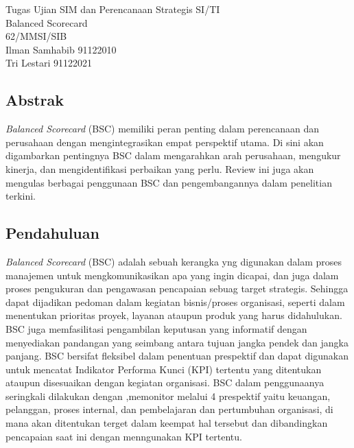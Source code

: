 \documentclass{article}
\title{}
\begin{document}
\begin{center}
    Tugas Ujian SIM dan Perencanaan Strategis SI/TI\\
    Balanced Scorecard\\
    62/MMSI/SIB\\
    Ilman Samhabib 91122010\\
    Tri Lestari 91122021\\	
\end{center}
\subsection*{Abstrak}



\emph{Balanced Scorecard} (BSC) memiliki peran penting dalam perencanaan dan perusahaan dengan mengintegrasikan empat perspektif utama. Di sini akan digambarkan pentingnya BSC dalam mengarahkan arah perusahaan, mengukur kinerja, dan mengidentifikasi perbaikan yang perlu. Review ini juga akan mengulas berbagai penggunaan BSC dan pengembangannya dalam penelitian terkini.
\subsection*{Pendahuluan}
\emph{Balanced Scorecard} (BSC) adalah sebuah kerangka yng digunakan dalam proses manajemen untuk mengkomunikasikan apa yang ingin dicapai, dan juga dalam proses pengukuran dan pengawasan pencapaian sebuag target strategis. Sehingga dapat dijadikan pedoman dalam kegiatan bisnis/proses organisasi, seperti dalam menentukan  prioritas proyek, layanan ataupun produk  yang harus didahulukan. BSC juga memfasilitasi pengambilan keputusan yang informatif dengan menyediakan pandangan yang seimbang antara tujuan jangka pendek dan jangka panjang. BSC bersifat fleksibel dalam penentuan prespektif dan dapat digunakan untuk mencatat Indikator Performa Kunci (KPI) tertentu yang ditentukan ataupun disesuaikan dengan kegiatan organisasi. BSC dalam penggunaanya seringkali dilakukan dengan ,memonitor melalui 4 prespektif yaitu  keuangan, pelanggan, proses internal, dan pembelajaran dan pertumbuhan organisasi, di mana akan ditentukan terget dalam keempat hal tersebut dan dibandingkan pencapaian saat ini dengan menngunakan KPI tertentu. 
\end{document}

